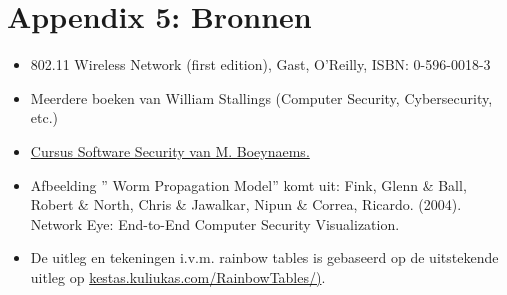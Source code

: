 \documentclass[
  10pt,
  dutch,
  paper=a4,
  ,captions=tableheading
]{scrbook}
\providecommand{\tightlist}{%
  \setlength{\itemsep}{0pt}\setlength{\parskip}{0pt}}
\begin{document}
\chapter{Appendix 5: Bronnen}\label{appendix-5-bronnen}

\begin{itemize}
\tightlist
\item
  802.11 Wireless Network (first edition), Gast, O'Reilly, ISBN:
  0-596-0018-3
\item
  Meerdere boeken van William Stallings (Computer Security,
  Cybersecurity, etc.)
\item
  \href{https://apwt.gitbook.io/software-security/https/001introductioncryptography}{Cursus
  Software Security van M. Boeynaems.}
\item
  Afbeelding '' Worm Propagation Model'' komt uit: Fink, Glenn \& Ball,
  Robert \& North, Chris \& Jawalkar, Nipun \& Correa, Ricardo. (2004).
  Network Eye: End-to-End Computer Security Visualization.
\item
  De uitleg en tekeningen i.v.m. rainbow tables is gebaseerd op de
  uitstekende uitleg op
  \href{http://kestas.kuliukas.com/RainbowTables/}{kestas.kuliukas.com/RainbowTables/)}.
\end{itemize}

\backmatter
\end{document}
